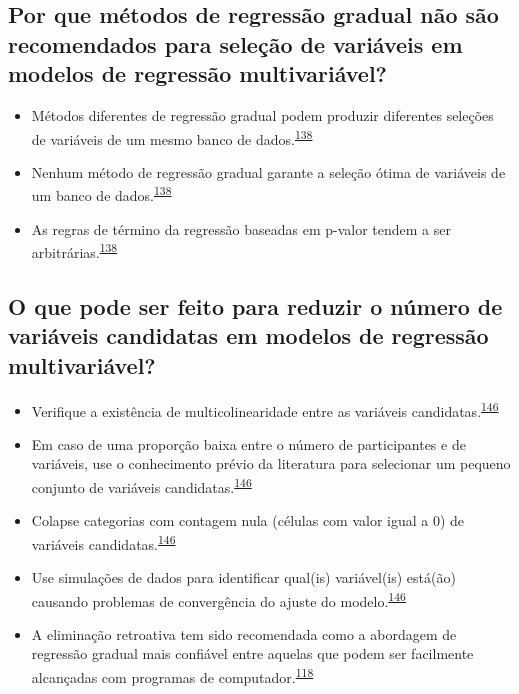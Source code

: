 \documentclass[
  a4paper,
]{book}
\begin{document}
\hypertarget{por-que-muxe9todos-de-regressuxe3o-gradual-nuxe3o-suxe3o-recomendados-para-seleuxe7uxe3o-de-variuxe1veis-em-modelos-de-regressuxe3o-multivariuxe1vel}{%
\subsection{Por que métodos de regressão gradual não são recomendados para seleção de variáveis em modelos de regressão multivariável?}\label{por-que-muxe9todos-de-regressuxe3o-gradual-nuxe3o-suxe3o-recomendados-para-seleuxe7uxe3o-de-variuxe1veis-em-modelos-de-regressuxe3o-multivariuxe1vel}}

\begin{itemize}
\item
  Métodos diferentes de regressão gradual podem produzir diferentes seleções de variáveis de um mesmo banco de dados.\textsuperscript{\protect\hyperlink{ref-Healy1995}{138}}
\item
  Nenhum método de regressão gradual garante a seleção ótima de variáveis de um banco de dados.\textsuperscript{\protect\hyperlink{ref-Healy1995}{138}}
\item
  As regras de término da regressão baseadas em p-valor tendem a ser arbitrárias.\textsuperscript{\protect\hyperlink{ref-Healy1995}{138}}
\end{itemize}

\hypertarget{o-que-pode-ser-feito-para-reduzir-o-nuxfamero-de-variuxe1veis-candidatas-em-modelos-de-regressuxe3o-multivariuxe1vel}{%
\subsection{O que pode ser feito para reduzir o número de variáveis candidatas em modelos de regressão multivariável?}\label{o-que-pode-ser-feito-para-reduzir-o-nuxfamero-de-variuxe1veis-candidatas-em-modelos-de-regressuxe3o-multivariuxe1vel}}

\begin{itemize}
\item
  Verifique a existência de multicolinearidade entre as variáveis candidatas.\textsuperscript{\protect\hyperlink{ref-Sun1996}{146}}
\item
  Em caso de uma proporção baixa entre o número de participantes e de variáveis, use o conhecimento prévio da literatura para selecionar um pequeno conjunto de variáveis candidatas.\textsuperscript{\protect\hyperlink{ref-Sun1996}{146}}
\item
  Colapse categorias com contagem nula (células com valor igual a 0) de variáveis candidatas.\textsuperscript{\protect\hyperlink{ref-Sun1996}{146}}
\item
  Use simulações de dados para identificar qual(is) variável(is) está(ão) causando problemas de convergência do ajuste do modelo.\textsuperscript{\protect\hyperlink{ref-Sun1996}{146}}
\item
  A eliminação retroativa tem sido recomendada como a abordagem de regressão gradual mais confiável entre aquelas que podem ser facilmente alcançadas com programas de computador.\textsuperscript{\protect\hyperlink{ref-heinze2016}{118}}
\end{itemize}
\end{document}

